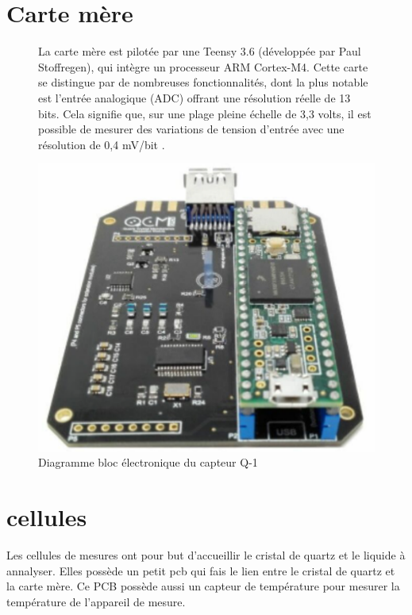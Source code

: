 \section{Carte mère}
\begin{figure}[H]
    \centering
    \begin{minipage}{0.48\textwidth}
        \small
        La carte mère est pilotée par une Teensy 3.6 (développée par Paul Stoffregen), 
        qui intègre un processeur ARM Cortex-M4. Cette carte se distingue par de nombreuses fonctionnalités, 
        dont la plus notable est l'entrée analogique (ADC) offrant une résolution réelle de 13 bits. 
        Cela signifie que, sur une plage pleine échelle de 3,3 volts, il est possible de mesurer des variations de tension d’entrée avec une résolution de 0,4 mV/bit \cite{manual-openqcmQ1}.
    \end{minipage}\hfill
    \begin{minipage}{0.48\textwidth}
        \centering
        \includegraphics[width=\textwidth]{assets/figures/Quartz-Crystal-Microbalance-openQCM-Q-1-Shield-Photo.png}
        \caption{Diagramme bloc électronique du capteur Q-1}
        \label{fig:Main Board Q-1}
    \end{minipage}
\end{figure}

\section{cellules}
Les cellules de mesures ont pour but d'accueillir le cristal de quartz et le liquide à annalyser.
Elles possède un petit pcb qui fais le lien entre le cristal de quartz et la carte mère.
Ce PCB possède aussi un capteur de température pour mesurer la température de l'appareil de mesure.

